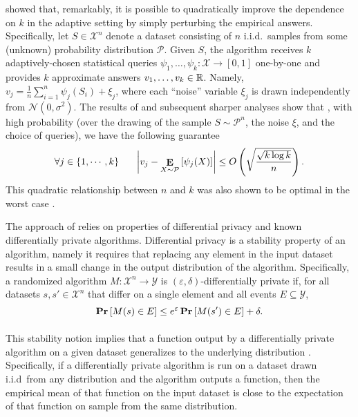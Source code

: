 \documentclass[final,12pt]{colt2018}
\newcommand{\ex}[2]{{\ifx&#1& \E \else \E_{#1} \fi \left[#2\right]}}
\newcommand{\prob}[2]{\pr_{#1}\left[#2\right]}
\providecommand\X{\mathcal{X}}
\providecommand{\cP}{{\mathcal P}}
\begin{document}
\citet{DworkFHPRR14:arxiv} showed that, remarkably, it is possible to quadratically improve the dependence on $k$ in the adaptive setting by simply perturbing the empirical answers. Specifically, let $S \in \X^n$ denote a dataset consisting of $n$ i.i.d.~samples from some (unknown) probability distribution $\cP$. Given $S$, the algorithm receives $k$ adaptively-chosen statistical queries $\psi_1, \ldots, \psi_k : \X \to [0,1]$ one-by-one and provides $k$ approximate answers $v_1, \ldots, v_k  \in {\mathbb R}$. Namely, $v_j = \frac{1}{n} \sum_{i = 1}^n \psi_j(S_i) + \xi_j$, where each ``noise'' variable $\xi_j$ is drawn independently from $\mathcal{N}(0,\sigma^2)$. The results of \citet{DworkFHPRR14:arxiv} and subsequent sharper analyses \citep{BassilyNSSSU16,Steinke16} show that%
, with high probability (over the drawing of the sample $S \sim \cP^n$, the noise $\xi$, and the choice of queries), we have the following guarantee \begin{equation}\forall j \in \{1, \cdots, k\} ~~~~~ \left| v_j - \ex{X \sim \cP}{\psi_j(X)} \right| \leq O \left( \sqrt{\frac{\sqrt{k \log k}}{n}} \right).\label{eqn:additive}\end{equation}
This quadratic relationship between $n$ and $k$ was also shown to be optimal in the worst case \citep{HardtU14,SteinkeU15}.


The approach of \citet{DworkFHPRR14:arxiv} relies on properties of differential privacy \citep{DworkMNS:06,DworkKMMN06} and known differentially private algorithms. Differential privacy is a stability property of an algorithm, namely it requires that replacing any element in the input dataset results in a small change in the output distribution of the algorithm. Specifically, a randomized algorithm $M : \X^n \to \mathcal Y$ is $(\varepsilon,\delta)$-differentially private if, for all datasets $s,s' \in \X^n$ that differ on a single element and all events $E \subseteq \mathcal{Y}$, $$\prob{}{M(s) \in E} \leq e^\varepsilon \prob{}{M(s')\in E} + \delta.$$%

This stability notion implies that a function output by a differentially private algorithm on a given dataset generalizes to the underlying distribution \citep{DworkFHPRR14:arxiv,BassilyNSSSU16}. Specifically, if a differentially private algorithm is run on a dataset drawn i.i.d~from any distribution and the algorithm outputs a function, then the empirical mean of that function on the input dataset is close to the expectation of that function on sample from the same distribution.
\end{document}
